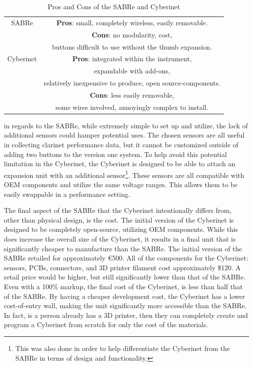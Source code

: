 \begin{table}[]
    \centering
    \begin{tabular}{|c||c|}
    \hline
     SABRe & \textbf{Pros}: small, completely wireless, easily removable. \\
         & \textbf{Cons}: no modularity, cost, \\
         & buttons difficult to use without the thumb expansion.\\
         \hline
    Cyberinet & \textbf{Pros}: integrated within the instrument,\\
    & expandable with add-ons,\\ 
    & relatively inexpensive to produce, open source-components.\\
    & \textbf{Cons}: less easily removable, \\
    & some wires involved, annoyingly complex to install.\\
    \hline
    \end{tabular}
    \caption{Pros and Cons of the SABRe and Cyberinet}
    \label{tab:sabreCyberinetProCons}
\end{table}



in regards to the SABRe, while extremely simple to set up and utilize, the lack of additional sensors could hamper potential uses. The chosen sensors are all useful in collecting clarinet performance data, but it cannot be customized outside of adding two buttons to the version one system. To help avoid this potential limitation in the Cyberinet, the Cyberinet is designed to be able to attach an expansion unit with an additional sensor\footnote{This was also done in order to help differentiate the Cyberinet from the SABRe in terms of design and functionality.}. These sensors are all compatible with OEM components and utilize the same voltage ranges. This allows them to be easily swappable in a performance setting.

The final aspect of the SABRe that the Cyberinet intentionally differs from, other than physical design, is the cost. The initial version of the Cyberinet is designed to be completely open-source, utilizing OEM components. While this does increase the overall size of the Cyberinet, it results in a final unit that is significantly cheaper to manufacture than the SABRe. The initial version of the SABRe retailed for approximately €500. All of the components for the Cyberinet: sensors, PCBs, connectors, and 3D printer filament cost approximately \$120. A retail price would be higher, but still significantly lower than that of the SABRe. Even with a 100\% markup, the final cost of the Cyberinet, is less than half that of the SABRe. By having a cheaper development cost, the Cyberinet has a lower cost-of-entry wall, making the unit significantly more accessible than the SABRe. In fact, is a person already has a 3D printer, then they can completely create and program a Cyberinet from scratch for only the cost of the materials.

